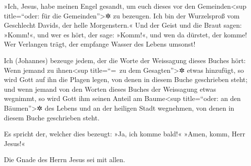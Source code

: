  »Ich, Jesus, habe meinen Engel gesandt, um euch dieses
vor den Gemeinden\textless sup title=``oder: für die
Gemeinden''\textgreater✲ zu bezeugen. Ich bin der Wurzelsproß vom
Geschlecht Davids, der helle Morgenstern.«  Und der Geist
und die Braut sagen: »Komm!«, und wer es hört, der sage: »Komm!«, und
wen da dürstet, der komme! Wer Verlangen trägt, der empfange Wasser des
Lebens umsonst!

 Ich (Johannes) bezeuge jedem, der die Worte der
Weissagung dieses Buches hört: Wenn jemand zu ihnen\textless sup
title=``=~zu dem Gesagten''\textgreater✲ etwas hinzufügt, so wird Gott
auf ihn die Plagen legen, von denen in diesem Buche geschrieben steht;
 und wenn jemand von den Worten dieses Buches der
Weissagung etwas wegnimmt, so wird Gott ihm seinen Anteil am
Baume\textless sup title=``oder: an den Bäumen''\textgreater✲ des Lebens
und an der heiligen Stadt wegnehmen, von denen in diesem Buche
geschrieben steht.

 Es spricht der, welcher dies bezeugt: »Ja, ich komme
bald!« »Amen, komm, Herr Jesus!«

 Die Gnade des Herrn Jesus sei mit allen.
